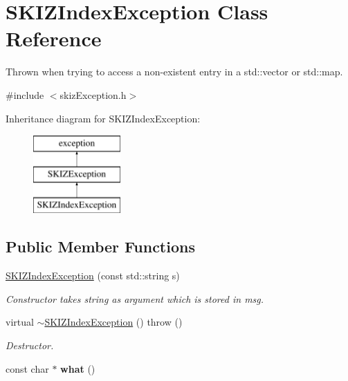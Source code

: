 \hypertarget{classSKIZIndexException}{}\section{S\+K\+I\+Z\+Index\+Exception Class Reference}
\label{classSKIZIndexException}


Thrown when trying to access a non-\/existent entry in a std\+::vector or std\+::map.  




{\ttfamily \#include $<$skiz\+Exception.\+h$>$}

Inheritance diagram for S\+K\+I\+Z\+Index\+Exception\+:\begin{figure}[H]
\begin{center}
\leavevmode
\includegraphics[height=3.000000cm]{classSKIZIndexException}
\end{center}
\end{figure}
\subsection*{Public Member Functions}
\begin{DoxyCompactItemize}
\item 
\mbox{\label{classSKIZIndexException_abd89a7895a20077dbb514271c6455f75}} 
\mbox{\hyperlink{classSKIZIndexException_abd89a7895a20077dbb514271c6455f75}{S\+K\+I\+Z\+Index\+Exception}} (const std\+::string s)
\begin{DoxyCompactList}\small\item\em Constructor takes string as argument which is stored in msg. \end{DoxyCompactList}\item 
\mbox{\label{classSKIZIndexException_ad41e9aa637c94d9e559f84333c6fafb5}} 
virtual \mbox{\hyperlink{classSKIZIndexException_ad41e9aa637c94d9e559f84333c6fafb5}{$\sim$\+S\+K\+I\+Z\+Index\+Exception}} ()  throw ()
\begin{DoxyCompactList}\small\item\em Destructor. \end{DoxyCompactList}\item 
\mbox{\label{classSKIZIndexException_a9f02457a3301bf0618023b25f8d79007}} 
const char $\ast$ {\bfseries what} ()
\end{DoxyCompactItemize}


